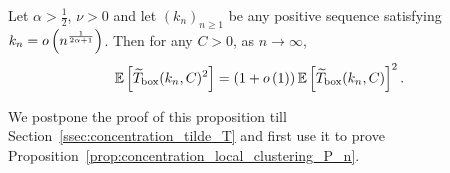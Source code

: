 %

\begin{proposition}\label{prop:concentration_tilde_T_P_n}
Let $\alpha > \frac{1}{2}$, $\nu > 0$ and let $(k_n)_{n \ge 1}$ be any positive sequence satisfying $k_n = o\left(n^{\frac{1}{2\alpha+1}}\right)$. Then for any $C > 0$, as $n \to \infty$,
\[
	\mathbb{E}\left[\widetilde{T}_{\text{box}}(k_n,C)^2\right] = \left(1 + o\left(1\right)\right)\mathbb{E}\left[\widetilde{T}_{\text{box}}(k_n, C)\right]^2.
\]
\end{proposition}

We postpone the proof of this proposition till Section~\ref{ssec:concentration_tilde_T} and first use it to prove Proposition~\ref{prop:concentration_local_clustering_P_n}. 

